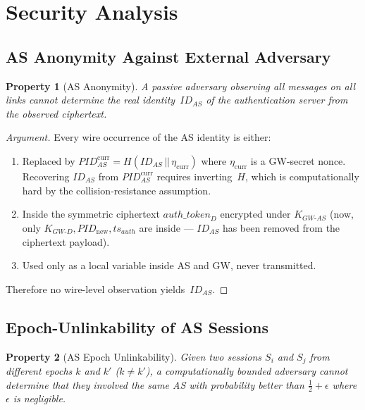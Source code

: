 \documentclass[12pt,a4paper]{article}
\newtheorem{property}{Property}[section]
\newcommand{\IDas}{\mathit{ID}_{AS}}
\newcommand{\PIDnew}{\mathit{PID}_{\mathrm{new}}}
\newcommand{\PIDascurr}{\mathit{PID}_{AS}^{\mathrm{curr}}}
\newcommand{\KGWd}{K_{GW\text{-}D}}
\newcommand{\KGWas}{K_{GW\text{-}AS}}
\newcommand{\authtoken}{\mathit{auth\_token}_D}
\newcommand{\etacurr}{\eta_{\mathrm{curr}}}
\begin{document}
\section{Security Analysis}

\subsection{AS Anonymity Against External Adversary}

\begin{property}[AS Anonymity]
\label{prop:as-anon}
A passive adversary observing all messages on all links cannot
determine the real identity~$\IDas$ of the authentication server
from the observed ciphertext.
\end{property}

\begin{proof}[Argument]
Every wire occurrence of the AS identity is either:
\begin{enumerate}
  \item Replaced by $\PIDascurr = H(\IDas \,||\, \etacurr)$ where
        $\etacurr$ is a GW-secret nonce.  Recovering $\IDas$ from
        $\PIDascurr$ requires inverting~$H$, which is computationally
        hard by the collision-resistance assumption.
  \item Inside the symmetric ciphertext $\authtoken$ encrypted under
        $\KGWas$ (now, only $\KGWd, \PIDnew, ts_{\mathit{auth}}$ are
        inside --- $\IDas$ has been removed from the ciphertext payload).
  \item Used only as a local variable inside AS and GW, never
        transmitted.
\end{enumerate}
Therefore no wire-level observation yields~$\IDas$.
\end{proof}

\subsection{Epoch-Unlinkability of AS Sessions}

\begin{property}[AS Epoch Unlinkability]
\label{prop:unlinkability}
Given two sessions $S_i$ and $S_j$ from different epochs $k$ and $k'$
($k \neq k'$), a computationally bounded adversary cannot determine
that they involved the same AS with probability better than
$\frac{1}{2} + \epsilon$ where $\epsilon$ is negligible.
\end{property}
\end{document}
